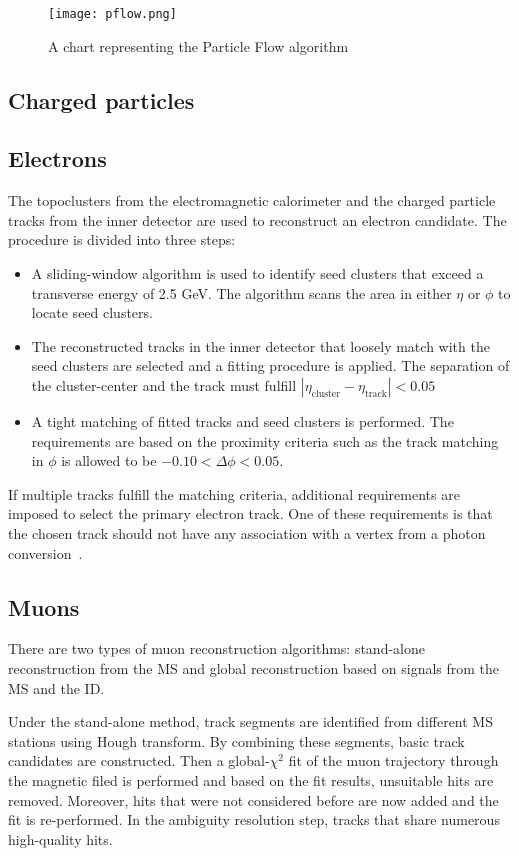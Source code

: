 \begin{figure}[htbp]
    \centering
    \texttt{[image: pflow.png]}
    \caption[Particle flow overview]{A chart representing the Particle Flow algorithm~\cite{Aaboud:2257597}}%
    \label{fig:pflow}
\end{figure}

\subsection{Charged particles}
\subsection*{Electrons}
The topoclusters from the electromagnetic calorimeter and the charged particle tracks from the inner
detector are used to reconstruct an electron candidate. The procedure is divided into three steps:
\begin{itemize}
    \item A sliding-window algorithm is used to identify seed clusters that exceed a transverse
    energy of 2.5 GeV. The algorithm scans the area in either $\eta$ or $\phi$ to locate seed clusters. 
    \item The reconstructed tracks in the inner detector that loosely match with the seed clusters
    are selected and a fitting procedure is applied. The separation of the cluster-center and the 
    track must fulfill $|\eta_{\text{cluster}} - \eta_{\text{track}}|<0.05$
    \item A tight matching of fitted tracks and seed clusters is performed. The requirements are based
    on the proximity criteria such as the track matching in $\phi$ is allowed to be $-0.10< \Delta\phi <0.05$.
\end{itemize}

If multiple tracks fulfill the matching criteria, additional requirements are imposed to select the 
primary electron track. One of these requirements is that the chosen track should not have any association with 
a vertex from a photon conversion~\cite{Aaboud_2019}. 

\subsection*{Muons}
There are two types of muon reconstruction algorithms: stand-alone reconstruction from the MS and global
reconstruction based on signals from the MS and the ID. 

Under the stand-alone method, track segments are identified from different MS stations using Hough transform.
By combining these segments, basic track candidates are constructed. Then a global-$\chi^2$ fit of the 
muon trajectory through the magnetic filed is performed and based on the fit results, unsuitable hits are
removed. Moreover, hits that were not considered before are now added and the fit is re-performed. 
In the ambiguity resolution step, tracks that share numerous high-quality hits. 

